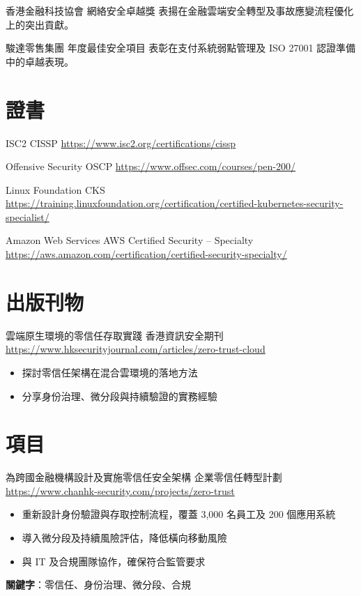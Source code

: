 \documentclass[a4paper, serif, 10pt]{moderncv}
\begin{document}
        {香港金融科技協會}
        {網絡安全卓越獎}
        {}
        {}
        {表揚在金融雲端安全轉型及事故應變流程優化上的突出貢獻。}

        {駿達零售集團}
        {年度最佳安全項目}
        {}
        {}
        {表彰在支付系統弱點管理及 ISO 27001 認證準備中的卓越表現。}
\section{證書}

        {ISC2}
        {CISSP}
        {\url{https://www.isc2.org/certifications/cissp}}
        {}
        {}

        {Offensive Security}
        {OSCP}
        {\url{https://www.offsec.com/courses/pen-200/}}
        {}
        {}

        {Linux Foundation}
        {CKS}
        {\url{https://training.linuxfoundation.org/certification/certified-kubernetes-security-specialist/}}
        {}
        {}

        {Amazon Web Services}
        {AWS Certified Security – Specialty}
        {\url{https://aws.amazon.com/certification/certified-security-specialty/}}
        {}
        {}
\section{出版刊物}

        {雲端原生環境的零信任存取實踐}
        {香港資訊安全期刊}
        {\url{https://www.hksecurityjournal.com/articles/zero-trust-cloud}}
        {}
        {\begin{itemize}
\item 探討零信任架構在混合雲環境的落地方法
\item 分享身份治理、微分段與持續驗證的實務經驗
\end{itemize}}
\section{項目}

        {為跨國金融機構設計及實施零信任安全架構}
        {企業零信任轉型計劃}
        {\url{https://www.chanhk-security.com/projects/zero-trust}}
        {}
        {\begin{itemize}
\item 重新設計身份驗證與存取控制流程，覆蓋 3,000 名員工及 200 個應用系統
\item 導入微分段及持續風險評估，降低橫向移動風險
\item 與 IT 及合規團隊協作，確保符合監管要求
\end{itemize}
\textbf{關鍵字}：零信任、身份治理、微分段、合規}
\end{document}
